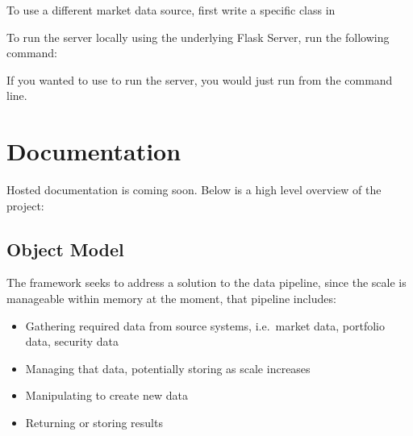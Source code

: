 \documentclass[letterpaper,10pt,english]{sphinxmanual}
\begin{document}
\begin{sphinxVerbatim}[commandchars=\\\{\}]

   
\end{sphinxVerbatim}

\sphinxAtStartPar
To use a different market data source, first write a specific
 class in 

\sphinxAtStartPar
To run the server locally using the underlying Flask Server, run the
following command:

\begin{sphinxVerbatim}[commandchars=\\\{\}]
 
\end{sphinxVerbatim}

\sphinxAtStartPar
If you wanted to use  to run the server, you would just run
 from the command line.


\section{Documentation}
\label{\detokenize{readme:documentation}}
\sphinxAtStartPar
Hosted documentation is coming soon. Below is a high level overview of
the project:


\subsection{Object Model}
\label{\detokenize{readme:object-model}}
\sphinxAtStartPar
The framework seeks to address a solution to the data pipeline, since
the scale is manageable within memory at the moment, that pipeline
includes:
\begin{itemize}
\item {} 
\sphinxAtStartPar
Gathering required data from source systems, i.e. market data,
portfolio data, security data

\item {} 
\sphinxAtStartPar
Managing that data, potentially storing as scale increases

\item {} 
\sphinxAtStartPar
Manipulating to create new data

\item {} 
\sphinxAtStartPar
Returning or storing results

\end{itemize}
\end{document}
